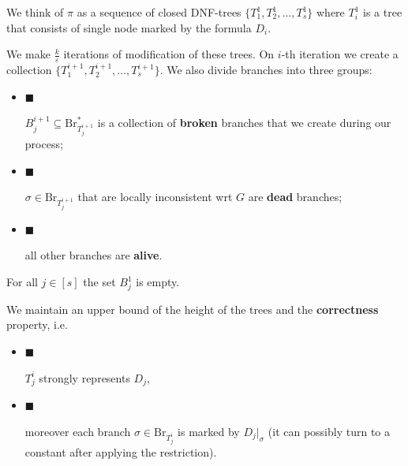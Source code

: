 \documentclass[10pt,a4paper]{article}
\begin{document}
We think of $\pi$ as a sequence of closed DNF-trees $\{T^{1}_{1},T^{1}_{2},\dots,T^{1}_{s}\}$
where $T^{1}_{i}$ is a tree that consists of single node marked by the formula $D_{i}$.\par




We make $\frac{k}{\varepsilon}$ iterations of modification of these trees. On $i$-th iteration we create
a collection $\{T^{i+1}_{1},T^{i+1}_{2},\dots,T^{i+1}_{s}\}$. We also divide branches into three
groups:\par


\begin{itemize}


\item[] 
$\blacksquare$ 


$B^{i+1}_{j}\subseteq\mathrm{Br}^{*}_{T^{i+1}_{j}}$ is a collection of \textbf{broken} branches that
we create during our process;\par





\item[] 
$\blacksquare$ 


$\sigma\in\mathrm{Br}_{T^{i+1}_{j}}$ that are locally inconsistent wrt $G$ are \textbf{dead} branches;\par





\item[] 
$\blacksquare$ 


all other branches are \textbf{alive}.\par





\end{itemize}


For all $j\in[s]$ the set $B^{1}_{j}$ is empty.\par




We maintain an upper bound of the height of the trees and the \textbf{correctness} property, i.e.\par


\begin{itemize}


\item[] 
$\blacksquare$ 


$T^{i}_{j}$ strongly represents $D_{j}$,\par





\item[] 
$\blacksquare$ 


moreover each branch $\sigma\in\mathrm{Br}_{T^{i}_{j}}$ is marked by $D_{j}|_{\sigma}$ (it can possibly
turn to a constant after applying the restriction).\par





\end{itemize}
\end{document}
